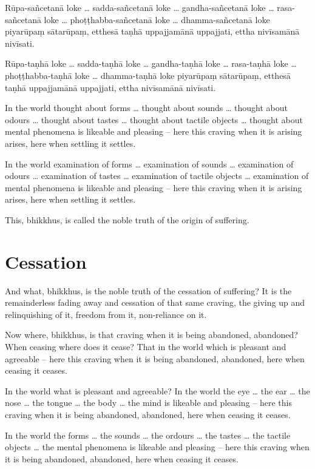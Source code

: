 Rūpa-sañcetanā loke \ldots{} sadda-sañcetanā loke \ldots{} gandha-sañcetanā loke
\ldots{} rasa-sañcetanā loke \ldots{} phoṭṭhabba-sañcetanā loke \ldots{}
dhamma-sañcetanā loke piyarūpaṃ sātarūpaṃ, etthesā taṇhā uppajjamānā uppajjati,
ettha nivīsamānā nivīsati.

Rūpa-taṇhā loke \ldots{} sadda-taṇhā loke \ldots{} gandha-taṇhā loke \ldots{}
rasa-taṇhā loke \ldots{} phoṭṭhabba-taṇhā loke \ldots{} dhamma-taṇhā loke piyarūpaṃ
sātarūpaṃ, etthesā taṇhā uppajjamānā uppajjati, ettha nivīsamānā nivīsati.

\englishPage

In the world thought about forms \ldots{} thought about sounds \ldots{} thought
about odours \ldots{} thought about tastes \ldots{} thought about tactile
objects \ldots{} thought about mental phenomena is likeable and pleasing -- here
this craving when it is arising arises, here when settling it settles.

In the world examination of forms \ldots{} examination of sounds \ldots{}
examination of odours \ldots{} examination of tastes \ldots{} examination of
tactile objects \ldots{} examination of mental phenomena is likeable and
pleasing -- here this craving when it is arising arises, here when settling it
settles.

This, bhikkhus, is called the noble truth of the origin of suffering.

\section{Cessation}

And what, bhikkhus, is the noble truth of the cessation of suffering? It is the
remainderless fading away and cessation of that same craving, the giving up and
relinquishing of it, freedom from it, non-reliance on it.

Now where, bhikkhus, is that craving when it is being abandoned, abandoned? When
ceasing where does it cease? That in the world which is pleasant and agreeable
-- here this craving when it is being abandoned, abandoned, here when ceasing it
ceases.

In the world what is pleasant and agreeable? In the world the eye \ldots{} the
ear \ldots{} the nose \ldots{} the tongue \ldots{} the body \ldots{} the mind is
likeable and pleasing -- here this craving when it is being abandoned, abandoned,
here when ceasing it ceases.

In the world the forms \ldots{} the sounds \ldots{} the ordours \ldots{} the
tastes \ldots{} the tactile objects \ldots{} the mental phenomena is likeable
and pleasing -- here this craving when it is being abandoned, abandoned, here
when ceasing it ceases.


